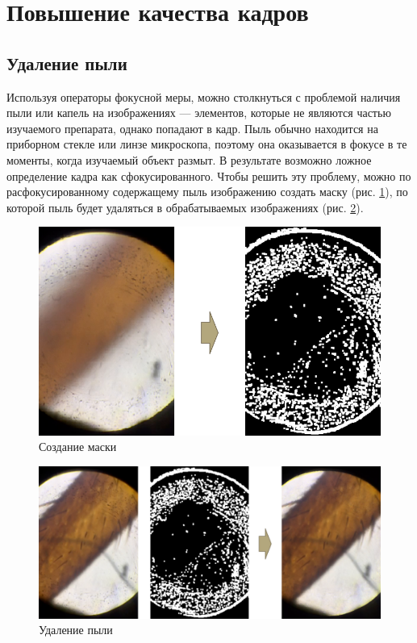 \documentclass[14pt]{matmex-diploma-custom}
\begin{document}
\section{Повышение качества кадров}
\subsection{Удаление пыли}

Используя операторы фокусной меры, можно столкнуться с проблемой наличия пыли или капель на изображениях --- элементов, которые не являются частью изучаемого препарата, однако попадают в кадр. Пыль обычно находится на приборном стекле или линзе микроскопа, поэтому она оказывается в фокусе в те моменты, когда изучаемый объект размыт. В результате возможно ложное определение кадра как сфокусированного. Чтобы решить эту проблему, можно по расфокусированному содержащему пыль изображению создать маску (рис. \ref{dust_map1}), по которой пыль будет удаляться в обрабатываемых изображениях (рис. \ref{dust_filtering1}).

\begin{figure}[h]
    \centering
    \includegraphics[width=1.0\textwidth]{figures/dust1.png}
    \caption{Создание маски}
    \label{dust_map1}
\end{figure}

\newpage

\begin{figure}[h]
    \centering
    \includegraphics[width=1.0\textwidth]{figures/dust2.png}
    \caption{Удаление пыли}
    \label{dust_filtering1}
\end{figure}
\end{document}
